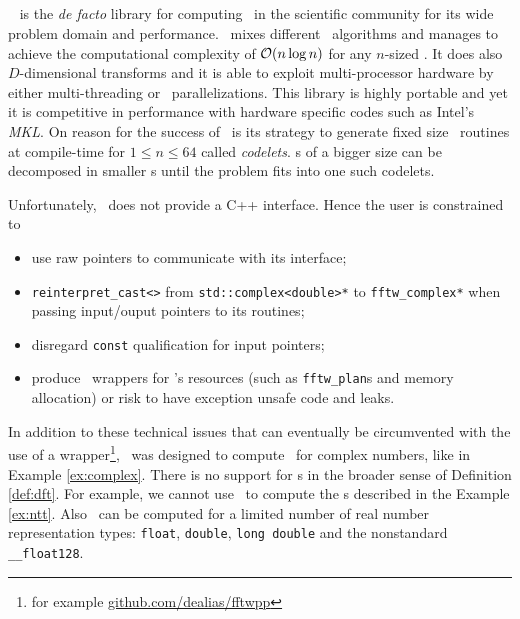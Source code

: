 \subsection{\fftw}
\fftw\ \cite{FFTW05} is the \emph{de facto} library for computing \dft\ in the scientific
community for its wide problem domain and performance.
\fftw\ mixes different \fft\ algorithms and manages to achieve the computational
complexity of $\mathcal{O}(n \log n)$ for any $n$-sized \dft. It does also
$D$-dimensional transforms and it is able to exploit multi-processor hardware by
either multi-threading or \mpi\ parallelizations. This library is highly portable
and yet it is competitive in performance with hardware specific codes such as
Intel's \emph{MKL}. On reason for the success of \fftw\ is its strategy to
generate fixed size \fft\ routines at compile-time for $1\le n\le 64$ called \emph{codelets}.
\dft{}s of a bigger size can be decomposed in smaller \dft{}s until the problem
fits into one such codelets.

Unfortunately, \fftw\ does not provide a C++ interface.
Hence the user is constrained to 
\begin{itemize}
    \item use raw pointers to communicate with its interface;
    \item \verb|reinterpret_cast<>| from
    \verb|std::complex<double>*| to \verb|fftw_complex*| when passing input/ouput
    pointers to its routines;
    \item disregard \verb|const| qualification for input pointers;
    \item produce \raii\ wrappers for \fftw's resources (such as
    \verb|fftw_plan|s and memory allocation) or risk to have exception unsafe
    code and leaks.
\end{itemize}
In addition to these technical issues that can eventually be circumvented with
the use of a wrapper\footnote{for example \url{github.com/dealias/fftwpp}},
\fftw\ was designed to compute \dft\ for
complex numbers, like in Example \ref{ex:complex}. 
There is no support for \dft{}s in the broader sense of Definition \ref{def:dft}.
For example, we cannot use \fftw\ to compute the \ntt{}s described in the
Example \ref{ex:ntt}. Also \dft\ can be computed for a limited number of real
number representation types: \verb|float|, \verb|double|, \verb|long double|
and the nonstandard \verb|__float128|.

